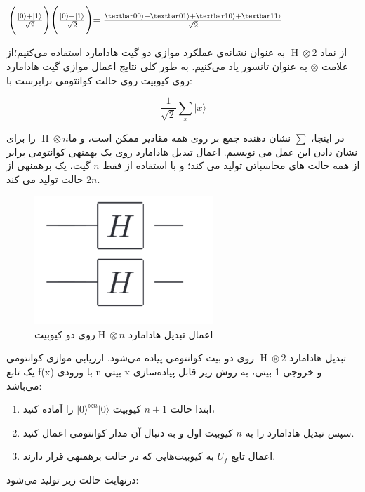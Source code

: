 \documentclass{book}
\begin{document}
\begin{center}
	$ \Biggl( \frac{\vert 0 \rangle + \vert 1 \rangle}{\sqrt{2}}\Biggl)\Biggl( \frac{\vert 0 \rangle + \vert 1 \rangle}{\sqrt{2}}\Biggl) = \frac{\textbar00\rangle + \textbar01\rangle + \textbar10\rangle + \textbar11\rangle}{\sqrt{2}}$

\end{center}

از نماد $\operatorname{H} \otimes 2$ به عنوان نشانه‌ی عملکرد موازی دو گیت هادامارد استفاده می‌کنیم؛از علامت $\otimes$ به عنوان تانسور یاد می‌کنیم. به طور کلی نتایج اعمال موازی گیت هادامارد روی  کیوبیت روی حالت کوانتومی برابرست با:

\begin{center}
	\[\frac{1}{\sqrt{2}} \sum_{x} \vert x \rangle\]
\end{center}


در اینجا، $\sum$ نشان دهنده جمع بر روی همه مقادیر ممکن  است، و ما$\operatorname{H} \otimes n$  را برای نشان دادن این عمل می نویسیم.
اعمال تبدیل هادامارد روی یک بهمنهی کوانتومی برابر از همه حالت های محاسباتی تولید می کند؛ و با استفاده از فقط $n$ گیت، یک برهمنهی از $2n$ حالت تولید می کند.
\begin{center}
	\begin{figure}[ht]
		\centering
		\includegraphics[width=0.6\textwidth]{Multyhadamard.png}
		\caption{اعمال تبدیل هادامارد $\operatorname{H} \otimes n$روی دو کیوبیت}
	\end{figure}
\end{center}

تبدیل هادامارد $\operatorname{H} \otimes 2$ روی دو بیت کوانتومی پیاده می‌شود. ارزیابی موازی کوانتومی یک تابع f(x) با ورودی n بیتی x و خروجی 1 بیتی، به روش زیر قابل پیاده‌سازی می‌باشد:

\begin{enumerate}
	\item ابتدا حالت $n + 1$ کیوبیت $\vert0\rangle^{\otimes n} \vert 0\rangle$ را آماده کنید،
	\item سپس تبدیل هادامارد را به $n$ کیوبیت اول و به دنبال آن مدار کوانتومی اعمال کنید.
	\item اعمال تابع $U_{f}$ به کیوبیت‌هایی که در حالت برهمنهی قرار دارند.
\end{enumerate}
درنهایت حالت زیر تولید ‌می‌شود:
\end{document}
